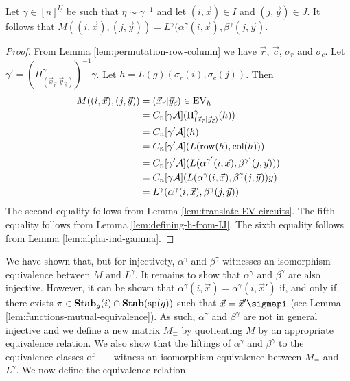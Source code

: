 \documentclass[../paper.tex]{subfiles}
\begin{document}
\begin{thm}
  Let $\gamma\in [n]^{\underline{U}}$ be such that $\eta \sim \gamma^{-1}$ and
  let $(i, \vec{x})\in I$ and $(j, \vec{y})\in J$. It follows that $M((i,
  \vec{x}), (j, \vec{y})) = L^{\gamma}(\alpha^{\gamma}(i, \vec{x}),
  \beta^{\gamma}(j, \vec{y})$.
  \label{lem:ML-equal-elements}
\end{thm}
\begin{proof}
  From Lemma \ref{lem:permutation-row-column} we have $\vec{r}$, $\vec{c}$,
  $\sigma_r$ and $\sigma_c$. Let $\gamma' = (\Pi^{\gamma}_{(\vec{x}_{\vec{r}}
    \vert \vec{y}_{\vec{c}})})^{-1} \gamma$. Let $h = L(g)(\sigma_r(i),
  \sigma_c(j))$. Then
  \begin{align*}
    M((i, \vec{x}), (j, \vec{y}))
    &= (\vec{x}_{\vec{r}} \vert \vec{y}_{\vec{c}}) \in \text{EV}_h \\
    &= C_n[\gamma \mathcal{A}] (\Pi^{\gamma}_{(\vec{x}_{\vec{r}} \vert \vec{y}_{\vec{c}})} (h)) \\
    &= C_n[\gamma' \mathcal{A}] (h) \\
    &= C_n[\gamma' \mathcal{A}](L(\text{row}(h), \text{col} (h)))\\
    &= C_n[\gamma' \mathcal{A}](L(\alpha^{\gamma'}(i, \vec{x}), \beta^{\gamma'}(j, \vec{y})))\\
    &= C_n[\gamma \mathcal{A}](L(\alpha^{\gamma}(i, \vec{x}), \beta^{\gamma}(j, \vec{y}))y)\\
    &= L^{\gamma}(\alpha^{\gamma}(i, \vec{x}), \beta^{\gamma}(j, \vec{y}))
  \end{align*}
  The second equality follows from Lemma \ref{lem:translate-EV-circuits}. The
  fifth equality follows from Lemma \ref{lem:defining-h-from-IJ}. The sixth
  equality follows from Lemma \ref{lem:alpha-ind-gamma}.
\end{proof}

We have shown that, but for injectivety, $\alpha^{\gamma}$ and $\beta^{\gamma}$
witnesses an isomorphism-equivalence between $M$ and $L^{\gamma}$. It remains to
show that $\alpha^{\gamma}$ and $\beta^{\gamma}$ are also injective. However, it
can be shown that $\alpha^{\gamma}(i, \vec{x}) = \alpha^{\gamma}(i, \vec{x}')$
if, and only if, there exists $\pi \in \text{\textbf{Stab}}_g(i) \cap \text{\textbf{Stab}} (\text{sp} (g))$ such that
$\vec{x} = \vec{x}'\sigmapi$ (see Lemma \ref{lem:functions-mutual-equivalence}).
As such, $\alpha^{\gamma}$ and $\beta^{\gamma}$ are not in general injective and
we define a new matrix $M_{\equiv}$ by quotienting $M$ by an appropriate
equivalence relation. We also show that the liftings of $\alpha^{\gamma}$ and
$\beta^{\gamma}$ to the equivalence classes of $\equiv$ witness an
isomorphism-equivalence between $M_\equiv$ and $L^{\gamma}$. We now define the
equivalence relation.
\end{document}
